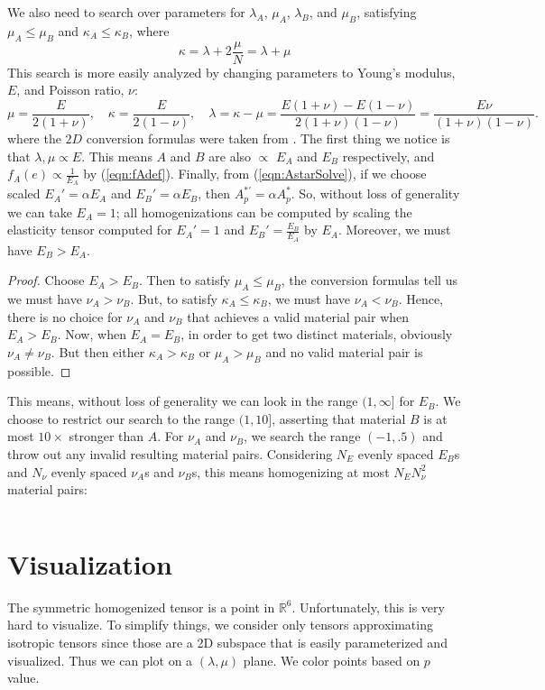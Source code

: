 \documentclass[10pt]{article}
\begin{document}
We also need to search over parameters for $\lambda_A$, $\mu_A$, $\lambda_B$,
and $\mu_B$, satisfying $\mu_A \le \mu_B$ and $\kappa_A \le \kappa_B$, where
$$
 \kappa = \lambda + 2\frac{\mu}{N} = \lambda + \mu
$$
This search is more easily analyzed by changing parameters to Young's modulus,
$E$, and Poisson ratio, $\nu$:
$$
\mu = \frac{E}{2(1 + \nu)}, \quad
\kappa = \frac{E}{2(1 - \nu)}, \quad
\lambda = \kappa - \mu = \frac{E(1 + \nu) - E(1 - \nu)}{2(1 + \nu)(1 - \nu)}
= \frac{E \nu}{(1 + \nu)(1 - \nu)}.
$$
where the $2D$ conversion formulas were taken from \cite{jasiuk}.
The first thing we notice is that $\lambda, \mu \propto E$. This means $A$ and
$B$ are also $\propto$ $E_A$ and $E_B$ respectively, and $f_A(e) \propto
\frac{1}{E_A}$ by (\ref{eqn:fAdef}).
Finally, from (\ref{eqn:AstarSolve}), if we choose scaled $E_A' = \alpha E_A$
and $E_B' = \alpha E_B$, then $A_p^{*\prime} = \alpha A_p^*$. So, without loss of
generality we can take $E_A = 1$; all homogenizations can be computed
by scaling the elasticity tensor computed for $E_A' = 1$ and $E_B' =
\frac{E_B}{E_A}$ by $E_A$. Moreover, we must have $E_B > E_A$.
\begin{proof}
    Choose $E_A > E_B$. Then to satisfy $\mu_A \le \mu_B$, the conversion
    formulas tell us we must have $\nu_A > \nu_B$. But, to satisfy $\kappa_A \le
    \kappa_B$, we must have $\nu_A < \nu_B$. Hence, there is no choice for
    $\nu_A$ and $\nu_B$ that achieves a valid material pair when $E_A > E_B$.
    Now, when $E_A = E_B$, in order to get two distinct materials, obviously
    $\nu_A \ne \nu_B$. But then either $\kappa_A > \kappa_B$ or $\mu_A > \mu_B$
    and no valid material pair is possible.
\end{proof}
This means, without loss of generality we can look in the range $(1, \infty]$
for $E_B$. We choose to restrict our search to the range $(1, 10]$, asserting
that material $B$ is at most $10\times$ stronger than $A$. For $\nu_A$ and
$\nu_B$, we search the range $(-1, .5)$ and throw out any invalid resulting
material pairs. Considering $N_E$ evenly spaced $E_B$s and $N_\nu$ evenly spaced
$\nu_A$s and $\nu_B$s, this means homogenizing at most $N_E N_\nu^2$ material
pairs:
\inputminted[linenos,fontsize=\footnotesize]{matlab}{materialScan.m}


\section{Visualization}
The symmetric homogenized tensor is a point in $\mathbb{R}^6$. Unfortunately,
this is very hard to visualize. To simplify things, we consider only tensors
approximating isotropic tensors since those are a 2D subspace that is easily
parameterized and visualized. Thus we can plot on a $(\lambda, \mu)$ plane. We
color points based on $p$ value.
\end{document}
